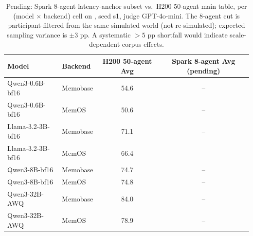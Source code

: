 \begin{table}[h]
\centering
\small
\caption{Pending: Spark 8-agent latency-anchor subset vs.\ H200 50-agent main table, per (model $\times$ backend) cell on \benchL, seed s1, judge GPT-4o-mini. The 8-agent cut is participant-filtered from the same simulated world (not re-simulated); expected sampling variance is $\pm 3$ pp. A systematic $>5$ pp shortfall would indicate scale-dependent corpus effects.}
\label{tab:spark-cross-check}
\begin{tabular}{llcc}
\toprule
Model              & Backend   & H200 50-agent Avg & Spark 8-agent Avg (pending) \\
\midrule
Qwen3-0.6B-bf16    & Memobase  & 54.6  & -- \\
Qwen3-0.6B-bf16    & MemOS     & 50.6  & -- \\
Llama-3.2-3B-bf16  & Memobase  & 71.1  & -- \\
Llama-3.2-3B-bf16  & MemOS     & 66.4  & -- \\
Qwen3-8B-bf16      & Memobase  & 74.7  & -- \\
Qwen3-8B-bf16      & MemOS     & 74.8  & -- \\
Qwen3-32B-AWQ      & Memobase  & 84.0  & -- \\
Qwen3-32B-AWQ      & MemOS     & 78.9  & -- \\
\bottomrule
\end{tabular}
\end{table}
